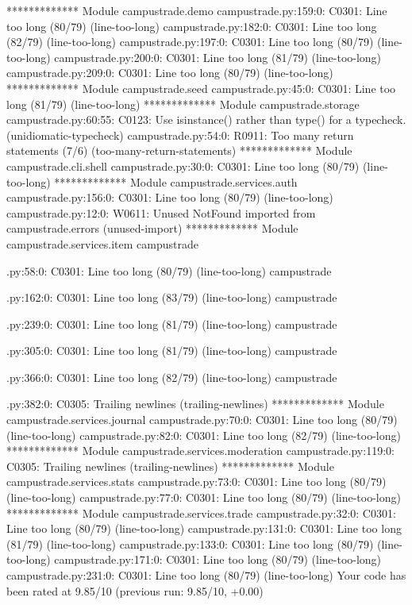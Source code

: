 ************* Module campustrade.demo
campustrade\demo.py:159:0: C0301: Line too long (80/79) (line-too-long)
campustrade\demo.py:182:0: C0301: Line too long (82/79) (line-too-long)
campustrade\demo.py:197:0: C0301: Line too long (80/79) (line-too-long)
campustrade\demo.py:200:0: C0301: Line too long (81/79) (line-too-long)
campustrade\demo.py:209:0: C0301: Line too long (80/79) (line-too-long)
************* Module campustrade.seed
campustrade\seed.py:45:0: C0301: Line too long (81/79) (line-too-long)
************* Module campustrade.storage
campustrade\storage.py:60:55: C0123: Use isinstance() rather than type() for a typecheck. (unidiomatic-typecheck)
campustrade\storage.py:54:0: R0911: Too many return statements (7/6) (too-many-return-statements)
************* Module campustrade.cli.shell
campustrade\cli\shell.py:30:0: C0301: Line too long (80/79) (line-too-long)
************* Module campustrade.services.auth
campustrade\services\auth.py:156:0: C0301: Line too long (80/79) (line-too-long)
campustrade\services\auth.py:12:0: W0611: Unused NotFound imported from campustrade.errors (unused-import)
************* Module campustrade.services.item
campustrade\services\item.py:58:0: C0301: Line too long (80/79) (line-too-long)
campustrade\services\item.py:162:0: C0301: Line too long (83/79) (line-too-long)
campustrade\services\item.py:239:0: C0301: Line too long (81/79) (line-too-long)
campustrade\services\item.py:305:0: C0301: Line too long (81/79) (line-too-long)
campustrade\services\item.py:366:0: C0301: Line too long (82/79) (line-too-long)
campustrade\services\item.py:382:0: C0305: Trailing newlines (trailing-newlines)
************* Module campustrade.services.journal
campustrade\services\journal.py:70:0: C0301: Line too long (80/79) (line-too-long)
campustrade\services\journal.py:82:0: C0301: Line too long (82/79) (line-too-long)
************* Module campustrade.services.moderation
campustrade\services\moderation.py:119:0: C0305: Trailing newlines (trailing-newlines)
************* Module campustrade.services.stats
campustrade\services\stats.py:73:0: C0301: Line too long (80/79) (line-too-long)
campustrade\services\stats.py:77:0: C0301: Line too long (80/79) (line-too-long)
************* Module campustrade.services.trade
campustrade\services\trade.py:32:0: C0301: Line too long (80/79) (line-too-long)
campustrade\services\trade.py:131:0: C0301: Line too long (81/79) (line-too-long)
campustrade\services\trade.py:133:0: C0301: Line too long (80/79) (line-too-long)
campustrade\services\trade.py:171:0: C0301: Line too long (80/79) (line-too-long)
campustrade\services\trade.py:231:0: C0301: Line too long (80/79) (line-too-long)
Your code has been rated at 9.85/10 (previous run: 9.85/10, +0.00)
